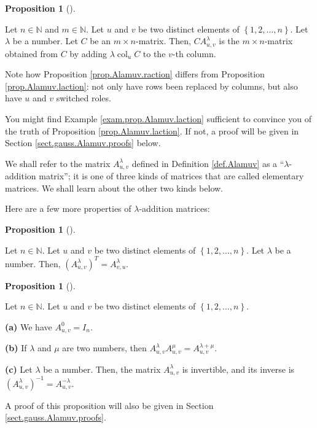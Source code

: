 \documentclass[numbers=enddot,12pt,final,onecolumn,notitlepage]{scrartcl}%
\theoremstyle{definition}
\newtheorem{prop}[theo]{Proposition}
\newenvironment{proposition}[1][]
{\begin{prop}[#1]\begin{leftbar}}
{\end{leftbar}\end{prop}}
\begin{document}
\begin{proposition}
\label{prop.Alamuv.raction}Let $n\in\mathbb{N}$ and $m\in\mathbb{N}$. Let $u$
and $v$ be two distinct elements of $\left\{  1,2,\ldots,n\right\}  $. Let
$\lambda$ be a number. Let $C$ be an $m\times n$-matrix. Then, $CA_{u,v}%
^{\lambda}$ is the $m\times n$-matrix obtained from $C$ by adding
$\lambda\operatorname*{col}\nolimits_{u}C$ to the $v$-th column.
\end{proposition}

Note how Proposition \ref{prop.Alamuv.raction} differs from Proposition
\ref{prop.Alamuv.laction}: not only have rows been replaced by columns, but
also have $u$ and $v$ switched roles.

You might find Example \ref{exam.prop.Alamuv.laction} sufficient to convince
you of the truth of Proposition \ref{prop.Alamuv.laction}. If not, a proof
will be given in Section \ref{sect.gauss.Alamuv.proofs} below.

We shall refer to the matrix $A_{u,v}^{\lambda}$ defined in Definition
\ref{def.Alamuv} as a \textquotedblleft$\lambda$-addition
matrix\textquotedblright; it is one of three kinds of matrices that are called
elementary matrices. We shall learn about the other two kinds below.

Here are a few more properties of $\lambda$-addition matrices:

\begin{proposition}
\label{prop.Alamuv.transpose}Let $n\in\mathbb{N}$. Let $u$ and $v$ be two
distinct elements of $\left\{  1,2,\ldots,n\right\}  $. Let $\lambda$ be a
number. Then, $\left(  A_{u,v}^{\lambda}\right)  ^{T}=A_{v,u}^{\lambda}$.
\end{proposition}

\begin{proposition}
\label{prop.Alamuv.lambda+mu}Let $n\in\mathbb{N}$. Let $u$ and $v$ be two
distinct elements of $\left\{  1,2,\ldots,n\right\}  $.

\textbf{(a)} We have $A_{u,v}^{0}=I_{n}$.

\textbf{(b)} If $\lambda$ and $\mu$ are two numbers, then $A_{u,v}^{\lambda
}A_{u,v}^{\mu}=A_{u,v}^{\lambda+\mu}$.

\textbf{(c)} Let $\lambda$ be a number. Then, the matrix $A_{u,v}^{\lambda}$
is invertible, and its inverse is $\left(  A_{u,v}^{\lambda}\right)
^{-1}=A_{u,v}^{-\lambda}$.
\end{proposition}

A proof of this proposition will also be given in Section
\ref{sect.gauss.Alamuv.proofs}.
\end{document}
